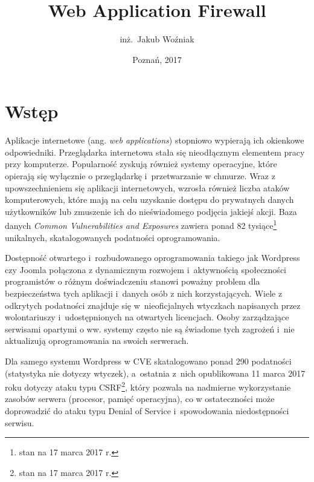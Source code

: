 \documentclass[11pt,a4paper,polish,thesis,oneside]{dcsbook}
\begin{document}
\author{inż.~Jakub Woźniak}
\title{Web Application Firewall}
\date{Poznań, 2017}
\maketitle
\frontmatter
\tableofcontents
\mainmatter


\chapter{Wstęp}

Aplikacje internetowe (ang. \textit{web applications}) stopniowo wypierają ich okienkowe odpowiedniki. Przeglądarka internetowa stała się nieodłącznym elementem pracy przy komputerze. Popularność zyskują również systemy operacyjne, które opierają się wyłącznie o przeglądarkę i~przetwarzanie w chmurze. Wraz z upowszechnieniem się aplikacji internetowych, wzrosła również liczba ataków komputerowych, które mają na celu uzyskanie dostępu do prywatnych danych użytkowników lub zmuszenie ich do nieświadomego podjęcia jakiejś akcji. Baza danych \textit{Common Vulnerabilities and Exposures}\cite{cve} zawiera ponad 82 tysiące\footnote{stan na 17 marca 2017 r.} unikalnych, skatalogowanych podatności oprogramowania.

Dostępność otwartego i~rozbudowanego oprogramowania takiego jak Wordpress\cite{wordpress} czy Joomla\cite{joomla} połączona z dynamicznym rozwojem i~aktywnością społeczności programistów o różnym doświadczeniu stanowi poważny problem dla bezpieczeństwa tych aplikacji i~danych osób z nich korzystających. Wiele z odkrytych podatności znajduje się w~nieoficjalnych wtyczkach napisanych przez wolontariuszy i~udostępnionych na otwartych licencjach. Osoby zarządzające serwisami opartymi o ww. systemy często nie są świadome tych zagrożeń i~nie aktualizują oprogramowania na swoich serwerach. 

Dla samego systemu Wordpress w CVE skatalogowano ponad 290 podatności (statystyka nie dotyczy wtyczek), a~ostatnia z~nich opublikowana 11 marca 2017 roku dotyczy ataku typu CSRF\footnote{stan na 17 marca 2017 r.}, który pozwala na nadmierne wykorzystanie zasobów serwera (procesor, pamięć operacyjna), co w ostateczności może doprowadzić do ataku typu Denial of Service i~spowodowania niedostępności serwisu.
\end{document}
